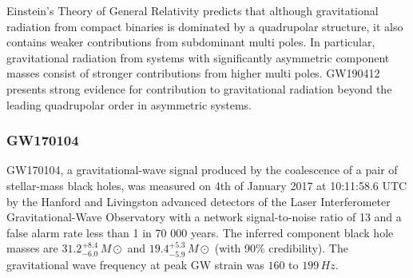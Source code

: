 Einstein’s Theory of General Relativity predicts that although gravitational radiation from compact binaries is dominated by a quadrupolar structure, it also contains weaker contributions from subdominant multi poles. In particular, gravitational radiation from systems with significantly asymmetric component masses consist of stronger contributions from higher multi poles. GW190412 presents strong evidence for contribution to gravitational radiation beyond the leading quadrupolar order in asymmetric systems.

\pagebreak

\subsubsection{GW170104}

GW170104, a gravitational-wave signal produced by the coalescence of a pair of stellar-mass black holes, was measured on 4th of January 2017 at 10:11:58.6 UTC by the Hanford and Livingston advanced detectors of the Laser Interferometer Gravitational-Wave Observatory with a network signal-to-noise ratio of 13 and a false alarm rate less than 1 in 70 000 years. The inferred component black hole masses are $31.2^{+8.4}_{-6.0}\,M\odot$  and $19.4^{+5.3}_{-5.9}\,M\odot$ (with 90\% credibility). The gravitational wave frequency at peak GW strain was $160$ to $199\, Hz$. \cite{PhysRevLett.118.221101}

